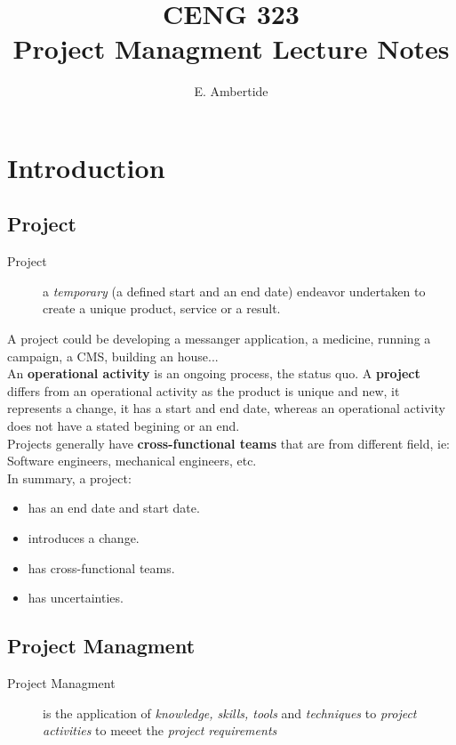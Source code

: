 \documentclass[11pt,a4paper,twocolumn]{book}
\author{E. Ambertide}
\title{\textbf{CENG 323} \\ \large{Project Managment Lecture Notes}}
\begin{document}
\maketitle

\chapter{Introduction}

\section{Project}

\begin{description}
\item[Project] a \textit{temporary} (a defined start and an end date) endeavor undertaken to create a unique product, service or a result.
\end{description}

A project could be developing a messanger application, a medicine, running a campaign, a CMS, building an house...\\

An \textbf{operational activity} is an ongoing process, the status quo. A \textbf{project} differs from an operational activity as the product is unique and new, it represents a change, it has a start and end date, whereas an operational activity does not have a stated begining or an end.\\

Projects generally have \textbf{cross-functional teams} that are from different field, ie: Software engineers, mechanical engineers, etc.\\

In summary, a project:

\begin{itemize}
\item has an end date and start date.
\item introduces a change.
\item has cross-functional teams.
\item has uncertainties.
\end{itemize}

\section{Project Managment}

\begin{description}
\item[Project Managment] is the application of \textit{knowledge, skills, tools} and \textit{techniques} to \textit{project activities} to meeet the \textit{project requirements}
\end{description}
\end{document}
